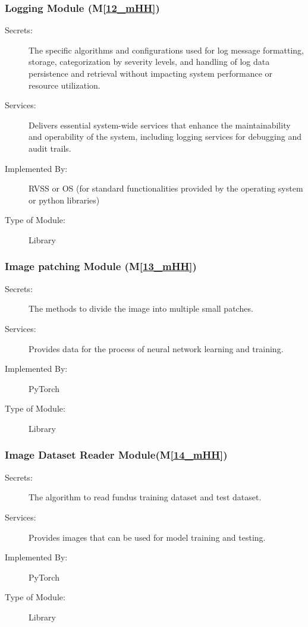 \documentclass[12pt, titlepage]{article}
\newcommand{\mref}[1]{M\ref{#1}}
\begin{document}
\subsubsection{Logging Module (\mref{12_mHH})}
\begin{description}
\item[Secrets:] The specific algorithms and configurations used for log message formatting, storage, categorization by severity levels, and handling of log data persistence and retrieval without impacting system performance or resource utilization.
\item[Services:] Delivers essential system-wide services that enhance the maintainability and operability of the system, including logging services for debugging and audit trails.
\item[Implemented By:] RVSS or OS (for standard functionalities provided by the operating system or python libraries)
\item[Type of Module:] Library
\end{description}

\subsubsection{Image patching Module (\mref{13_mHH})}
\begin{description}
\item[Secrets:] The methods to divide the image into multiple small patches. 
\item[Services:] Provides data for the process of neural network learning and training. 
\item[Implemented By:] PyTorch 
\item[Type of Module:] Library
\end{description}

\subsubsection{Image Dataset Reader Module(\mref{14_mHH})}
\begin{description}
\item[Secrets:]The algorithm to read fundus training dataset and test dataset. 
\item[Services:] Provides images that can be used for model training and testing. 
\item[Implemented By:] PyTorch
\item[Type of Module:] Library
\end{description}
\end{document}
